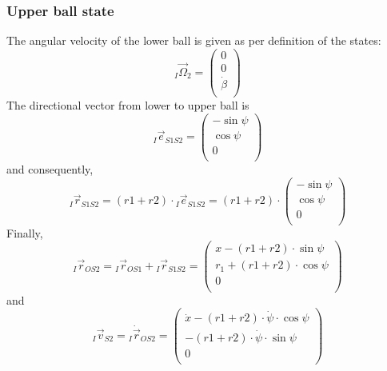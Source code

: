 \documentclass{article}
\begin{document}
\subsubsection{Upper ball state}
The angular velocity of the lower ball is given as per definition of the states:
\begin{equation}
{}_I \vec{\Omega}_2 = 
\left( {\begin{array}{c} 0 \\ 0 \\ \dot{\beta} \\ \end{array} } \right)
\end{equation}
The directional vector from lower to upper ball is
\begin{equation}
{}_I \vec{e}_{S1S2} = 
\left( {\begin{array}{c} -\sin{\psi} \\ \cos{\psi} \\ 0 \\ \end{array} } \right)
\end{equation}
and consequently, 
\begin{equation}
{}_I \vec{r}_{S1S2} = (r1+r2) \cdot {}_I \vec{e}_{S1S2} =
(r1+r2) \cdot \left( {\begin{array}{c} -\sin{\psi} \\ \cos{\psi} \\ 0 \\ \end{array} } \right)
\end{equation}
Finally,
\begin{equation}
{}_I \vec{r}_{OS2} = {}_I \vec{r}_{OS1} + {}_I \vec{r}_{S1S2} =
\left( {\begin{array}{c} x - (r1+r2) \cdot \sin{\psi} \\ r_1 + (r1+r2) \cdot \cos{\psi} \\ 0 \\ \end{array} } \right)
\end{equation} 
and
\begin{equation}
{}_I \vec{v}_{S2} = {}_I \dot{\vec{r}}_{OS2} =
\left( {\begin{array}{c} \dot{x} - (r1+r2) \cdot \dot{\psi} \cdot \cos{\psi} \\ - (r1+r2) \cdot \dot{\psi} \cdot \sin{\psi} \\ 0 \\ \end{array} } \right)
\end{equation} 
\end{document}
